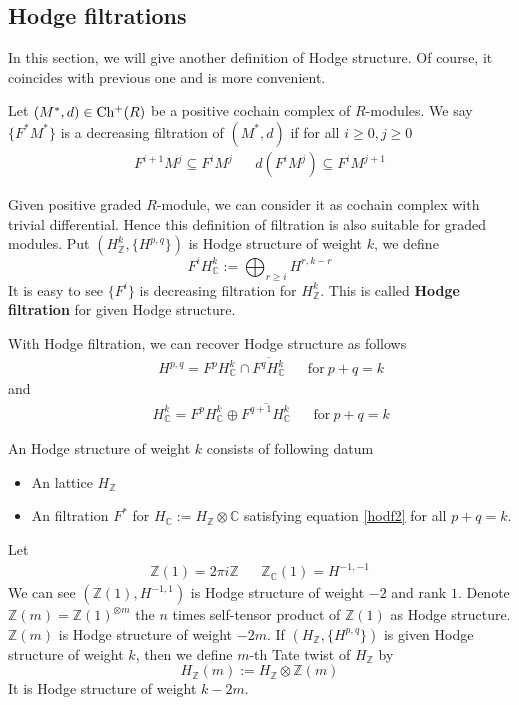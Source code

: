 \documentclass{amsart}
\begin{document}
\subsection{Hodge filtrations}
In this section, we will give another definition of Hodge structure. Of course, it coincides with previous one and is more convenient.
\begin{secdefn}
	Let $(M^*,d) \in \operatorname*{Ch^{+}}(R)$ be a positive cochain complex of $R$-modules. We say $\{F^*M^*\}$ is a decreasing filtration of $(M^*,d)$ if for all $i \geq 0 , j \geq 0$
	\[
	\begin{aligned}
	F^{i+1}M^j \subseteq F^{i}M^j& & d(F^iM^j) \subseteq F^iM^{j+1}
	\end{aligned}
	\]
\end{secdefn}
Given positive graded $R$-module, we can consider it as cochain complex with trivial differential. Hence this definition of filtration is also suitable for graded modules. Put $(H_\mathbb{Z}^k, \{H^{p,q}\})$ is Hodge structure of weight $k$, we define
\begin{equation}
	F^iH_{\mathbb{C}}^k:= \bigoplus_{r \geq i}H^{r,k-r}
\end{equation}
It is easy to see $\{F^i\}$ is decreasing filtration for $H_{\mathbb{Z}}^k$. This is called \textbf{Hodge filtration} for given Hodge structure.

With Hodge filtration, we can recover Hodge structure as follows
\begin{align}
	\label{hodf1}
	& &H^{p,q}= F^{p}H_{\mathbb{C}}^k \cap \overline{F^q H_{\mathbb{C}}^k} && \text{for}\ p+q=k
\end{align}
and 
\begin{align}
	\label{hodf2}
	& &H_\mathbb{C}^k= F^p H^k_\mathbb{C} \oplus  \overline{F^{q+1}H^k_{\mathbb{C}}}& &\text{for}\ p+q=k
\end{align}

\begin{secdefn}
	An Hodge structure of weight $k$ consists of following datum
	\begin{itemize}
		\item An lattice $H_\mathbb{Z}$
		\item An filtration $F^*$ for $H_\mathbb{C}:= H_\mathbb{Z} \otimes \mathbb{C}$ satisfying equation \ref{hodf2} for all $p+q=k$.
	\end{itemize}
\end{secdefn}

\begin{ex}
	Let 
	\begin{align}
		\mathbb{Z}(1)= 2\pi i \mathbb{Z}& & \mathbb{Z}_{\mathbb{C}}(1)= H^{-1,-1}
	\end{align}
	We can see $(\mathbb{Z}(1), H^{-1,1})$ is Hodge structure of weight $-2$ and rank $1$. Denote $\mathbb{Z}(m)= \mathbb{Z}(1)^{\otimes m}$ the $n$   times self-tensor product of $\mathbb{Z}(1)$ as Hodge structure. $\mathbb{Z}(m)$ is Hodge structure of weight $-2m$. If $(H_\mathbb{Z}, \{ H^{p,q}\})$ is given Hodge structure of weight $k$, then we define $m$-th Tate twist of $H_\mathbb{Z}$ by
	\[
	H_\mathbb{Z}(m):= H_\mathbb{Z} \otimes \mathbb{Z}(m)
	\] 
	It is Hodge structure of weight $k-2m$. 
\end{ex}
\end{document}
